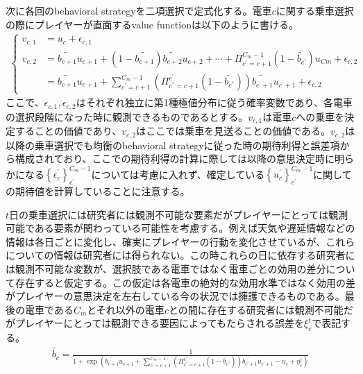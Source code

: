 \documentclass{jsarticle}
\begin{document}
次に各回のbehavioral strategyを二項選択で定式化する。電車$c$に関する乗車選択の際にプレイヤーが直面するvalue functionは以下のように書ける。
\begin{align*}
	\begin{cases}
	v_{c, 1} &= u_c + \epsilon_{c, 1}\\[8pt]
	v_{c, 2} &= \tilde{b_{c+1}} u_{c+1} + (1 - \tilde{b_{c+1}}) \tilde{b_{c+2}} u_{c+2} + \cdots + \Pi_{c^{'} = c+1}^{C_m-1}(1 - \tilde{b_{c^{'}}}) u_{Cm} + \epsilon_{c, 2}\\[8pt]
	&= \tilde{b_{c+1}} u_{c+1} + \sum_{c^{'}=c+1}^{C_m-1} \left( \Pi_{c^{''} = c+1}^{c^{'}} (1 - \tilde{b_{c^{''}}}) \right) \tilde{b_{c^{'} + 1}} u_{c^{'} + 1} + \epsilon_{c, 2}
	\end{cases}
\end{align*}
ここで、$\epsilon_{c, 1}, \epsilon_{c, 2}$はそれぞれ独立に第1種極値分布に従う確率変数であり、各電車の選択段階になった時に観測できるものであるとする。$v_{c, 1}$は電車$c$への乗車を決定することの価値であり、$v_{c, 2}$はここでは乗車を見送ることの価値である。$v_{c, 2}$は以降の乗車選択でも均衡のbehavioral strategyに従った時の期待利得と誤差項から構成されており、ここでの期待利得の計算に際しては以降の意思決定時に明らかになる$\left\{ \epsilon_c^{'} \right\}_{c^{'}}^{C_m-1}$については考慮に入れず、確定している$\left\{ u_c^{'} \right\}_{c^{'}}^{C_m-1}$に関しての期待値を計算していることに注意する。

$t$日の乗車選択には研究者には観測不可能な要素だがプレイヤーにとっては観測可能である要素が関わっている可能性を考慮する。例えば天気や遅延情報などの情報は各日ごとに変化し、確実にプレイヤーの行動を変化させているが、これらについての情報は研究者には得られない。この時これらの日に依存する研究者には観測不可能な変数が、選択肢である電車ではなく電車ごとの効用の差分について存在すると仮定する。この仮定は各電車の絶対的な効用水準ではなく効用の差がプレイヤーの意思決定を左右している今の状況では擁護できるものである。最後の電車である$C_m$とそれ以外の電車$c$との間に存在する研究者には観測不可能だがプレイヤーにとっては観測できる要因によってもたらされる誤差を$\xi_c^t$で表記する。
\begin{align*}
	\tilde{b_c} = \frac{1}{1 + \exp(\tilde{b_{c+1}} u_{c+1} + \sum_{c^{'}=c+1}^{C_m-1} \left( \Pi_{c^{''} = c+1}^{c^{'}} (1 - \tilde{b_{c^{''}}}) \right) \tilde{b_{c^{'} + 1}} u_{c^{'} + 1} - u_c + \eta_c^t)}
\end{align*}
\end{document}
